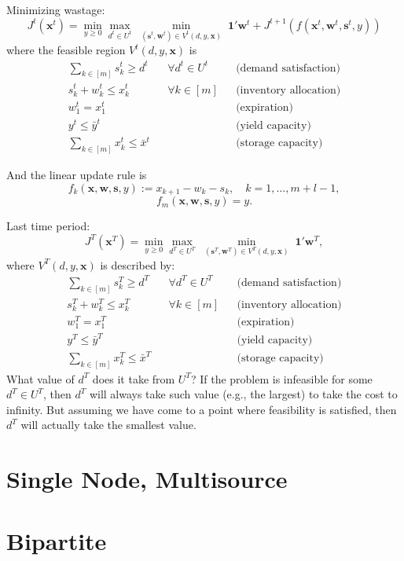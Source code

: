 \documentclass{article}
\newcommand{\x}{\mathbf{x}}
\newcommand{\w}{\mathbf{w}}
\newcommand{\s}{\mathbf{s}}
\begin{document}
Minimizing wastage: $$J^t(\x^t) = \min_{y \geq 0} \max_{d^t \in U^t} \; \min_{(\s^t,\w^t) \in V^t(d,y,\x)}  \; \mathbf{1}' \w^t + J^{t+1}(f(\x^t, \w^t, \s^t, y))$$
where the feasible region $V^t(d,y,\x)$ is 
\begin{align*} 
   \sum_{k \in [m]} s_{k}^t \geq d^t && \forall d^t \in U^t && \text{(demand satisfaction)} \\
   s_{k}^t + w_{k}^t \leq x_{k}^t && \forall k \in [m] && \text{(inventory allocation)} \\
   w_{1}^t = x_{1}^t && && \text{(expiration)} \\
   y^t \leq \bar{y}^t && && \text{(yield capacity)} \\
   \sum_{k \in [m]} x^t_{k} \leq \bar{x}^t &&  && \text{(storage capacity)}
\end{align*}

And the linear update rule is $$f_k(\x,\w,\s,y) := x_{k+1} - w_{k} - s_{k}, \quad k=1,\dots,m+l-1,$$
$$f_m(\x,\w,\s,y) = y.$$

Last time period: $$J^T(\x^T) = \min_{y \geq 0} \max_{d^T \in U^T} \; \min_{(\s^T,\w^T) \in V^T(d,y,\x)}  \; \mathbf{1}' \w^T ,$$
where $V^T(d,y,\x)$ is described by:
\begin{align*} 
   \sum_{k \in [m]} s_{k}^T \geq d^T && \forall d^T \in U^T && \text{(demand satisfaction)} \\
   s_{k}^T+ w_{k}^T \leq x_{k}^T && \forall k \in [m] && \text{(inventory allocation)} \\
   w_{1}^T = x_{1}^T && && \text{(expiration)} \\
   y^T \leq \bar{y}^T && && \text{(yield capacity)} \\
   \sum_{k \in [m]} x^T_{k} \leq \bar{x}^T &&  && \text{(storage capacity)}
\end{align*}
What value of $d^T$ does it take from $U^T$? If the problem is infeasible for some $d^T \in U^T$, then $d^T$ will always take such value (e.g., the largest) to take the cost to infinity. But assuming we have come to a point where feasibility is satisfied, then $d^T$ will actually take the smallest value. 

\section*{Single Node, Multisource}

\section*{Bipartite}
\end{document}
